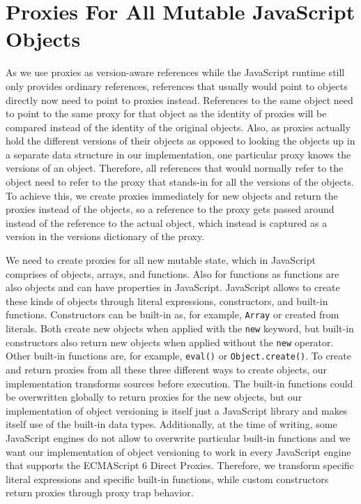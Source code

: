 \section{Proxies For All Mutable JavaScript Objects}

As we use proxies as version-aware references while the JavaScript runtime still only provides ordinary references, references that usually would point to objects directly now need to point to proxies instead. 
References to the same object need to point to the same proxy for that object as the identity of proxies will be compared instead of the identity of the original objects.
Also, as proxies actually hold the different versions of their objects as opposed to looking the objects up in a separate data structure in our implementation, one particular proxy knows the versions of an object.
Therefore, all references that would normally refer to the object need to refer to the proxy that stands-in for all the versions of the objects.
To achieve this, we create proxies immediately for new objects and return the proxies instead of the objects, so a reference to the proxy gets passed around instead of the reference to the actual object, which instead is captured as a version in the versions dictionary of the proxy.

We need to create proxies for all new mutable state, which in JavaScript comprises of objects, arrays, and functions.
Also for functions as functions are also objects and can have properties in JavaScript.
JavaScript allows to create these kinds of objects through literal expressions, constructors, and built-in functions.
Constructors can be built-in as, for example, \lstinline{Array} or created from literals.
Both create new objects when applied with the \lstinline{new} keyword, but built-in constructors also return new objects when applied without the \lstinline{new} operator.
Other built-in functions are, for example, \lstinline{eval()} or \lstinline{Object.create()}.
To create and return proxies from all these three different ways to create objects, our implementation transforms sources before execution.
The built-in functions could be overwritten globally to return proxies for the new objects, but our implementation of object versioning is itself just a JavaScript library and makes itself use of the built-in data types.
Additionally, at the time of writing, some JavaScript engines do not allow to overwrite particular built-in functions and we want our implementation of object versioning to work in every JavaScript engine that supports the ECMAScript 6 Direct Proxies.
Therefore, we transform specific literal expressions and specific built-in functions, while custom constructors return proxies through proxy trap behavior.

